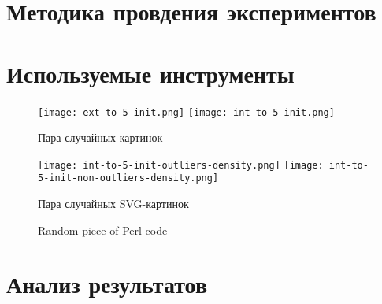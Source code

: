 \section{Методика провдения экспериментов}

\clearpage

\section{Используемые инструменты}

\begin{figure}[H]
    \texttt{[image: ext-to-5-init.png]}
    \texttt{[image: int-to-5-init.png]} \label{length_entropy}
    \caption{Пара случайных картинок}
\end{figure}

\begin{figure}[H]
    \texttt{[image: int-to-5-init-outliers-density.png]}
    \texttt{[image: int-to-5-init-non-outliers-density.png]} \label{length_entropy}
    \caption{Пара случайных SVG-картинок}
\end{figure}

\begin{figure}
    
    \caption{Random piece of Perl code}
\end{figure}

\clearpage

\section{Анализ результатов}

\clearpage
